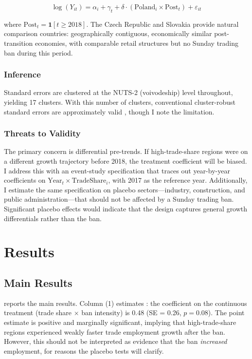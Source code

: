 \documentclass[12pt]{article}
\begin{document}
\begin{equation}
\log(Y_{it}) = \alpha_i + \gamma_t + \delta \cdot (\text{Poland}_i \times \text{Post}_t) + \varepsilon_{it}
\label{eq:crosscountry}
\end{equation}

\noindent where $\text{Post}_t = \mathbf{1}[t \geq 2018]$. The Czech Republic and Slovakia provide natural comparison countries: geographically contiguous, economically similar post-transition economies, with comparable retail structures but no Sunday trading ban during this period.

\subsubsection*{Inference} Standard errors are clustered at the NUTS-2 (voivodeship) level throughout, yielding 17 clusters. With this number of clusters, conventional cluster-robust standard errors are approximately valid \citep{MacKinnonWebb2017}, though I note the limitation.

\subsubsection*{Threats to Validity} The primary concern is differential pre-trends. If high-trade-share regions were on a different growth trajectory before 2018, the treatment coefficient will be biased. I address this with an event-study specification that traces out year-by-year coefficients on $\text{Year}_t \times \text{TradeShare}_i$, with 2017 as the reference year. Additionally, I estimate the same specification on placebo sectors---industry, construction, and public administration---that should not be affected by a Sunday trading ban. Significant placebo effects would indicate that the design captures general growth differentials rather than the ban.


\section{Results}
\label{sec:results}

\subsection{Main Results}

 reports the main results. Column (1) estimates : the coefficient on the continuous treatment (trade share $\times$ ban intensity) is 0.48 (SE = 0.26, $p = 0.08$). The point estimate is positive and marginally significant, implying that high-trade-share regions experienced weakly faster trade employment growth after the ban. However, this should not be interpreted as evidence that the ban \textit{increased} employment, for reasons the placebo tests will clarify.
\end{document}
